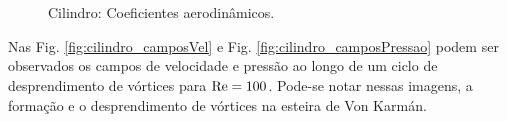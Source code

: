 \documentclass[tese_patricia]{subfiles}%
\begin{document}
\begin{figure}[!htb]
	\centering
	\\ 
	\\ 
	\caption{Cilindro: Coeficientes aerodinâmicos. }
	\label{fig:cilindro_coefAero}
\end{figure}

Nas Fig. \ref{fig:cilindro_camposVel} e Fig. \ref{fig:cilindro_camposPressao} podem ser observados os campos de velocidade e pressão ao longo de um ciclo de desprendimento de vórtices para $\mathrm{Re} = 100$. Pode-se notar nessas imagens, a formação e o desprendimento de vórtices na esteira de Von Karmán.
\end{document}
